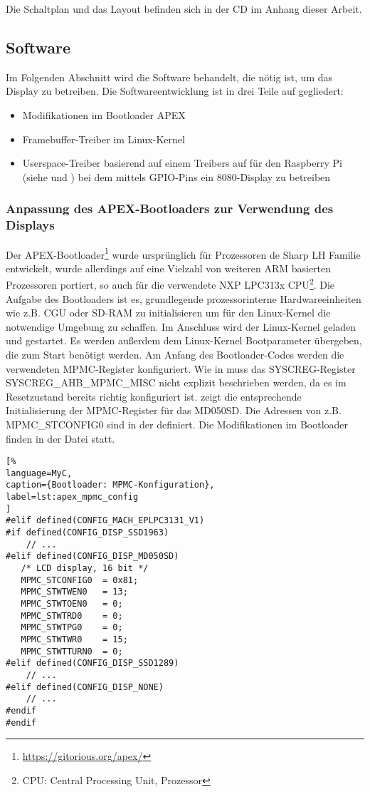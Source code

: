 Die Schaltplan und das Layout befinden sich in der CD im Anhang dieser Arbeit.
\newpage
\subsection{Software}
Im Folgenden Abschnitt wird die Software behandelt, die nötig ist, um das Display zu betreiben. 
Die Softwareentwicklung ist in drei Teile auf gegliedert:
\begin{itemize}
\item Modifikationen im Bootloader APEX
\item Framebuffer-Treiber im Linux-Kernel
\item Userspace-Treiber basierend auf einem Treibers auf für den Raspberry Pi (siehe \cite{Schlegel2013a} und \cite{Schlegel2013b}) bei dem mittels GPIO-Pins ein 8080-Display zu betreiben
\end{itemize}

\subsubsection{Anpassung des APEX-Bootloaders zur Verwendung des Displays}
Der APEX-Bootloader\footnote{\url{https://gitorious.org/apex/}} wurde ursprünglich für Prozessoren de Sharp LH Familie entwickelt, wurde allerdings auf eine Vielzahl von weiteren ARM basierten Prozessoren portiert, so auch für die verwendete NXP LPC313x CPU\footnote{CPU: Central Processing Unit, Prozessor}.
Die Aufgabe des Bootloaders ist es, grundlegende prozessorinterne Hardwareeinheiten wie z.B. CGU oder SD-RAM zu initialisieren um für den Linux-Kernel die notwendige Umgebung zu schaffen. Im Anschluss wird der Linux-Kernel geladen und gestartet. Es werden außerdem dem Linux-Kernel Bootparameter übergeben, die zum Start benötigt werden. Am Anfang des Bootloader-Codes werden die verwendeten MPMC-Register konfiguriert. Wie in  muss das SYSCREG-Register SYSCREG\_AHB\_MPMC\_MISC nicht explizit beschrieben werden, da es im Resetzustand bereits richtig konfiguriert ist.  zeigt die entsprechende Initialisierung der MPMC-Register für das MD050SD. Die Adressen von z.B. MPMC\_STCONFIG0 sind in der  definiert. Die Modifikationen im Bootloader finden in der Datei  statt.

\begin{lstlisting}[%
language=MyC,
caption={Bootloader: MPMC-Konfiguration},
label=lst:apex_mpmc_config
]
#elif defined(CONFIG_MACH_EPLPC3131_V1)
#if defined(CONFIG_DISP_SSD1963)
	// ...
#elif defined(CONFIG_DISP_MD050SD)
   /* LCD display, 16 bit */
   MPMC_STCONFIG0  = 0x81;
   MPMC_STWTWEN0   = 13;
   MPMC_STWTOEN0   = 0;
   MPMC_STWTRD0    = 0;
   MPMC_STWTPG0    = 0;
   MPMC_STWTWR0    = 15;
   MPMC_STWTTURN0  = 0;
#elif defined(CONFIG_DISP_SSD1289)
	// ...
#elif defined(CONFIG_DISP_NONE)
	// ...
#endif
#endif
\end{lstlisting}


